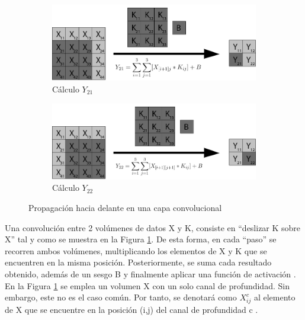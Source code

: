 \begin{figure}[H]
	\vspace{5mm}
	\begin{subfigure}{.5\textwidth}
		\hspace{-10mm}
		\includegraphics[width=1.2\linewidth]{imagenes/conv_3.jpg}  
		\caption{Cálculo $Y_{21}$}
	\end{subfigure}%
	\begin{subfigure}{.5\textwidth}
		\hspace{10mm}
		\includegraphics[width=1.2\linewidth]{imagenes/conv_4.jpg}  
		\caption{Cálculo $Y_{22}$}
	\end{subfigure}
	\caption{Propagación hacia delante en una capa convolucional}
	\label{fig:forward_prop_convolucional}
\end{figure}

Una convolución entre 2 volúmenes de datos X y K, consiste en ``deslizar K sobre X'' tal y como se muestra en la Figura \ref{fig:forward_prop_convolucional}. 
De esta forma, en cada ``paso'' se recorren ambos volúmenes, multiplicando los elementos de X y K 
que se encuentren en la misma posición. Posteriormente, se suma cada resultado obtenido, además de un sesgo B y finalmente aplicar una función de activación \cite{capa_convolucional}. \\
En la Figura \ref{fig:forward_prop_convolucional} se emplea un volumen X con un solo canal de profundidad. Sin embargo, este no es el caso común. Por tanto, se denotará como $X^{c}_{ij}$ al elemento de X que se encuentre en la posición (i,j) del canal de profundidad c \cite{capa_convolucional_Stanford}.

